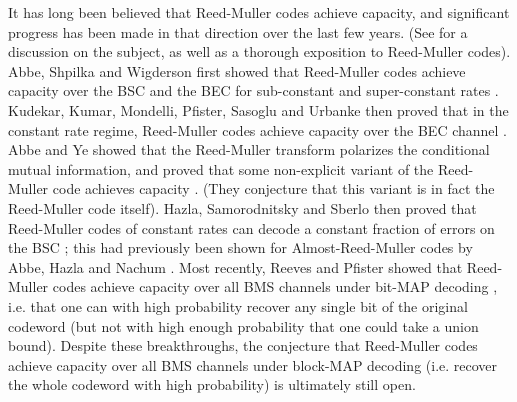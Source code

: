 \documentclass[12pt]{article}
\begin{document}
It has long been believed that Reed-Muller codes achieve capacity, and significant progress has been made in that direction over the last few years. (See \cite{abbe2021survey} for a discussion on the subject, as well as a thorough exposition to Reed-Muller codes). Abbe, Shpilka and Wigderson first showed that Reed-Muller codes achieve capacity over the BSC and the BEC for sub-constant and super-constant rates \cite{abbe2015RMlowrate}. Kudekar, Kumar, Mondelli, Pfister, Sasoglu and Urbanke then proved that in the constant rate regime, Reed-Muller codes achieve capacity over the BEC channel \cite{kudekar2016erasure}. Abbe and Ye showed that the Reed-Muller transform polarizes the conditional mutual information, and proved that some non-explicit variant of the Reed-Muller code achieves capacity \cite{abbe2019rmpolarize}. (They conjecture that this variant is in fact the Reed-Muller code itself). Hazla, Samorodnitsky and Sberlo then proved that Reed-Muller codes of constant rates can decode a constant fraction of errors on the BSC \cite{hazla2021polyclose}; this had previously been shown for Almost-Reed-Muller codes by Abbe, Hazla and Nachum \cite{abbe2020almostRM}. Most recently, Reeves and Pfister showed that Reed-Muller codes achieve capacity over all BMS channels under bit-MAP decoding \cite{reeves2021bitcapacity}, i.e. that one can with high probability recover any single bit of the original codeword (but not with high enough probability that one could take a union bound). Despite these breakthroughs, the conjecture that Reed-Muller codes achieve capacity over all BMS channels under block-MAP decoding (i.e. recover the whole codeword with high probability) is ultimately still open.
\end{document}
